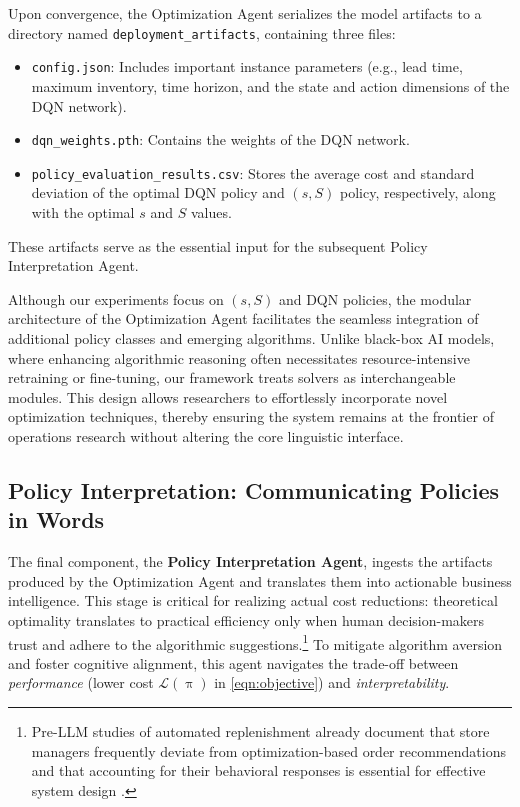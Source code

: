 \documentclass[mnsc,nonblindrev]{informs3_hide}
\newcommand{\policy}{\ensuremath{\uppi}}
\begin{document}
    
        Upon convergence, the Optimization Agent serializes the model artifacts to a directory named \texttt{deployment\_artifacts}, containing three files:
    
    \begin{itemize}
        \item \texttt{config.json}: Includes important instance parameters (e.g., lead time, maximum inventory, time horizon, and the state and action dimensions of the DQN network).
        \item \texttt{dqn\_weights.pth}: Contains the weights of the DQN network.
        \item \texttt{policy\_evaluation\_results.csv}: Stores the average cost and standard deviation of the optimal DQN policy and $(s, S)$ policy, respectively, along with the optimal $s$ and $S$ values.
    \end{itemize}
    These artifacts serve as the essential input for the subsequent Policy Interpretation Agent.

\begin{remark}
    Although our experiments focus on $(s,S)$ and DQN policies, the modular architecture of the Optimization Agent facilitates the seamless integration of additional policy classes and emerging algorithms. Unlike black-box AI models, where enhancing algorithmic reasoning often necessitates resource-intensive retraining or fine-tuning, our framework treats solvers as interchangeable modules. This design allows researchers to effortlessly incorporate novel optimization techniques, thereby ensuring the system remains at the frontier of operations research without altering the core linguistic interface.
\end{remark}

    
    
    \subsection{Policy Interpretation: Communicating Policies in Words}
    The final component, the \textbf{Policy Interpretation Agent}, ingests the artifacts produced by the Optimization Agent and translates them into actionable business intelligence. This stage is critical for realizing actual cost reductions: theoretical optimality translates to practical efficiency only when human decision-makers trust and adhere to the algorithmic suggestions.\footnote{Pre-LLM studies of automated replenishment already document that store managers frequently deviate from optimization-based order recommendations and that accounting for their behavioral responses is essential for effective system design \citep{van2010ordering}.} 
    To mitigate algorithm aversion and foster cognitive alignment, this agent navigates the trade-off between \emph{performance} (lower cost $\mathcal{L}(\policy)$ in \cref{eqn:objective}) and \emph{interpretability}.
\end{document}

